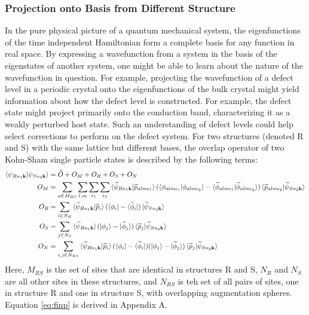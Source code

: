 \documentclass[12pt]{article}
\begin{document}
\subsubsection{Projection onto Basis from Different Structure}
In the pure physical picture of a quantum mechanical system, the eigenfunctions of the time
independent Hamiltonian form a complete basis for any function in real space. By expressing
a wavefunction from a system in the basis of the eigenstates of another system, one might
be able to learn about the nature of the wavefunction in question. For example, projecting
the wavefunction of a defect level in a periodic crystal onto the eigenfunctions of the
bulk crystal might yield information about how the defect level is constructed. For example,
the defect state might project primarily onto the conduction band, characterizing it
as a weakly perturbed host state. Such an understanding of defect levels could help select
corrections to perform on the defect system.\cite{lany}
For two structures (denoted R and S) with the same
lattice but different bases, the overlap operator of two Kohn-Sham single particle states
is described by the following terms:
\begin{equation}
\centering
\begin{split}
\braket{\psi_{Rn_1\mathbf{k}}|\psi_{Sn_2\mathbf{k}}} & =\widetilde{O}+O_M+O_R+O_S+O_N\\
O_M & =\sum_{a\in M_{RS}}\sum_{l,m}\sum_{\epsilon_1}\sum_{\epsilon_2}
\braket{\widetilde{\psi}_{Rn_1\mathbf{k}}|\widetilde{p}_{a\ind _1}}
(\braket{\phi_{a\ind _1}|{\phi_{a\ind _2}}}
-\braket{\widetilde{\phi}_{a\ind _1}|\widetilde{\phi}_{a\ind _2}})
\braket{\widetilde{p}_{a\ind _2}|\widetilde{\psi}_{Sn_2\mathbf{k}}}\\
O_R & =\sum_{i\in N_R}\braket{\widetilde{\psi}_{Rn_1\mathbf{k}}|\widetilde{p}_i}
(\bra{\phi_i}-\bra{\widetilde{\phi}_i})
\ket{\widetilde{\psi}_{Sn_2\mathbf{k}}}\\
O_S & =\sum_{j\in N_S}\bra{\widetilde{\psi}_{Rn_1\mathbf{k}}}(\ket{\phi_j}-\ket{\widetilde{\phi}_j})
\braket{\widetilde{p}_j|\widetilde{\psi}_{Sn_2\mathbf{k}}}\\
O_N & =\sum_{i,j\in N_{RS}}\braket{\widetilde{\psi}_{Rn_1\mathbf{k}}|
\widetilde{p}_i}(\bra{\phi_i}-\bra{\widetilde{\phi}_i})
(\ket{\phi_j}-\ket{\widetilde{\phi}_j})\braket{\widetilde{p}_j|\widetilde{\psi}_{Sn_2\mathbf{k}}}
\end{split}
\label{eq:finp}
\end{equation}
Here, $M_{RS}$ is the set of sites that are identical in structures R and S,
$N_R$ and $N_S$ are all other sites in these structures,
and $N_{RS}$ is teh set of all pairs of sites, one in structure R and one in structure
S, with overlapping augmentation spheres. Equation \ref{eq:finp} is derived in Appendix A.
\end{document}
